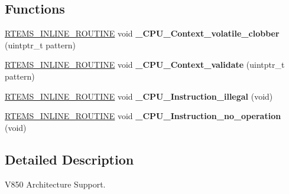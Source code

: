 \subsection*{Functions}
\begin{DoxyCompactItemize}
\item 
\mbox{\label{group__RTEMSScoreCPUV850_gaeb1ddd8f84f82b13fad2a05a3e7d0ab7}} 
\mbox{\hyperlink{group__RTEMSScoreBaseDefs_gac216239df231d5dbd15e3520b0b9313f}{R\+T\+E\+M\+S\+\_\+\+I\+N\+L\+I\+N\+E\+\_\+\+R\+O\+U\+T\+I\+NE}} void {\bfseries \+\_\+\+C\+P\+U\+\_\+\+Context\+\_\+volatile\+\_\+clobber} (uintptr\+\_\+t pattern)
\item 
\mbox{\label{group__RTEMSScoreCPUV850_gaae027d9a906bb67d38ebd7a9104b976b}} 
\mbox{\hyperlink{group__RTEMSScoreBaseDefs_gac216239df231d5dbd15e3520b0b9313f}{R\+T\+E\+M\+S\+\_\+\+I\+N\+L\+I\+N\+E\+\_\+\+R\+O\+U\+T\+I\+NE}} void {\bfseries \+\_\+\+C\+P\+U\+\_\+\+Context\+\_\+validate} (uintptr\+\_\+t pattern)
\item 
\mbox{\label{group__RTEMSScoreCPUV850_ga07618c93359f2485af2e98a96b330208}} 
\mbox{\hyperlink{group__RTEMSScoreBaseDefs_gac216239df231d5dbd15e3520b0b9313f}{R\+T\+E\+M\+S\+\_\+\+I\+N\+L\+I\+N\+E\+\_\+\+R\+O\+U\+T\+I\+NE}} void {\bfseries \+\_\+\+C\+P\+U\+\_\+\+Instruction\+\_\+illegal} (void)
\item 
\mbox{\label{group__RTEMSScoreCPUV850_gab683a0a37a089e2a0fd3c356836d5499}} 
\mbox{\hyperlink{group__RTEMSScoreBaseDefs_gac216239df231d5dbd15e3520b0b9313f}{R\+T\+E\+M\+S\+\_\+\+I\+N\+L\+I\+N\+E\+\_\+\+R\+O\+U\+T\+I\+NE}} void {\bfseries \+\_\+\+C\+P\+U\+\_\+\+Instruction\+\_\+no\+\_\+operation} (void)
\end{DoxyCompactItemize}


\subsection{Detailed Description}
V850 Architecture Support. 

